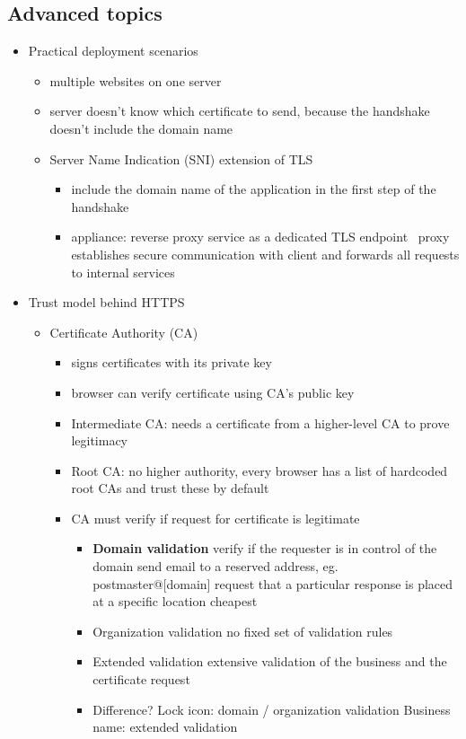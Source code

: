 \documentclass[12pt,titlepage,a4paper]{report}
\begin{document}
			\subsection{Advanced topics}
			\begin{itemize}
				\item Practical deployment scenarios
				\begin{itemize}
					\item multiple websites on one server
					\item server doesn't know which certificate to send, because the handshake doesn't include the domain name
					\item Server Name Indication (SNI) extension of TLS
					\begin{itemize}
						\item include the domain name of the application in the first step of the handshake
						\item appliance: reverse proxy service as a dedicated TLS endpoint \textrightarrow \, proxy establishes secure communication with client and forwards all requests to internal services
					\end{itemize}
				\end{itemize}
			
				\item Trust model behind HTTPS
				\begin{itemize}
					\item Certificate Authority (CA)
					\begin{itemize}
						\item signs certificates with its private key
						\item browser can verify certificate using CA's public key
						\item Intermediate CA: needs a certificate from a higher-level CA to prove legitimacy
						\item Root CA: no higher authority, every browser has a list of hardcoded root CAs and trust these by default
						\item CA must verify if request for certificate is legitimate
						\begin{itemize}
							\item \textbf{Domain validation} verify if the requester is in control of the domain
								\subitem send email to a reserved address, eg. postmaster@[domain]
								\subitem request that a particular response is placed at a specific location
								\subitem cheapest
							\item Organization validation
								\subitem no fixed set of validation rules
							\item Extended validation
								\subitem extensive validation of the business and the certificate request
							\item Difference?
								\subitem Lock icon: domain / organization validation
								\subitem Business name: extended validation
						\end{itemize}
					\end{itemize}
				\end{itemize}
				

\end{itemize}
\end{document}
